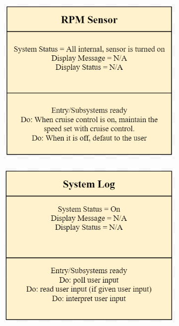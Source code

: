 \documentclass[preprint,11pt,3p]{article}
\begin{document}
\begin{enumerate}
\begin{figure}[H]
\begin{subfigure}{.3\textwidth}
				\label{fig:sub2}
			\end{subfigure}
			\begin{subfigure}{.3\textwidth}
				\centering
				\includegraphics[width=.8\linewidth]{images/rpmsensorindex.PNG}
				\label{fig:sub3}
			\end{subfigure}
			\center
			\begin{subfigure}{.3\textwidth}
				\centering
				\includegraphics[width=.8\linewidth]{images/systemlogindex.PNG}
				\label{fig:sub3}
			\end{subfigure}
			\begin{subfigure}{.3\textwidth}
				\centering

\end{subfigure}
\end{figure}
\end{enumerate}
\end{document}
